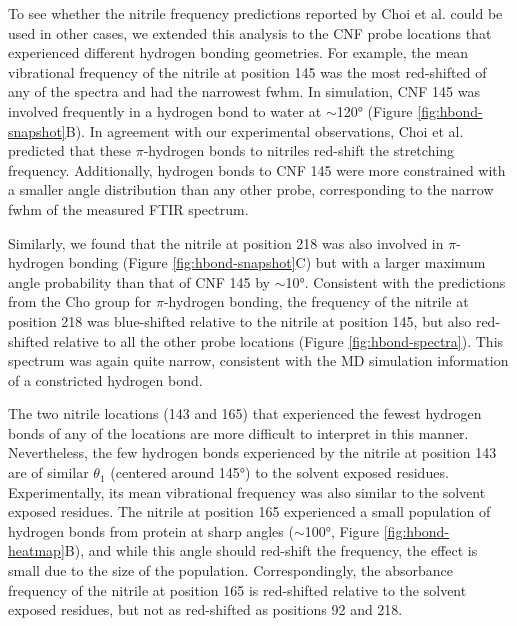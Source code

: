To see whether the nitrile frequency predictions reported by Choi et al. could be used in other cases, we extended this analysis to the CNF probe locations that experienced different hydrogen bonding geometries.
For example, the mean vibrational frequency of the nitrile at position 145 was the most red-shifted of any of the spectra and had the narrowest fwhm.
In simulation, CNF 145 was involved frequently in a hydrogen bond to water at $\sim$\ang{120} (Figure \ref{fig:hbond-snapshot}B).
In agreement with our experimental observations, Choi et al. predicted that these $\pi$-hydrogen bonds to nitriles red-shift the stretching frequency.
Additionally, hydrogen bonds to CNF 145 were more constrained with a smaller angle distribution than any other probe, corresponding to the narrow fwhm of the measured FTIR spectrum. 

Similarly, we found that the nitrile at position 218 was also involved in $\pi$-hydrogen bonding (Figure \ref{fig:hbond-snapshot}C) but with a larger maximum angle probability than that of CNF 145 by $\sim$\ang{10}.
Consistent with the predictions from the Cho group for $\pi$-hydrogen bonding, the frequency of the nitrile at position 218 was blue-shifted relative to the nitrile at position 145, but also red-shifted relative to all the other probe locations (Figure \ref{fig:hbond-spectra}).
This spectrum was again quite narrow, consistent with the MD simulation information of a constricted hydrogen bond. 

The two nitrile locations (143 and 165) that experienced the fewest hydrogen bonds of any of the locations are more difficult to interpret in this manner.
Nevertheless, the few hydrogen bonds experienced by the nitrile at position 143 are of similar $\theta_1$ (centered around \ang{145}) to the solvent exposed residues.
Experimentally, its mean vibrational frequency was also similar to the solvent exposed residues.
The nitrile at position 165 experienced a small population of hydrogen bonds from protein at sharp angles ($\sim$\ang{100}, Figure \ref{fig:hbond-heatmap}B), and while this angle should red-shift the frequency, the effect is small due to the size of the population.
Correspondingly, the absorbance frequency of the nitrile at position 165 is red-shifted relative to the solvent exposed residues, but not as red-shifted as positions 92 and 218. 

